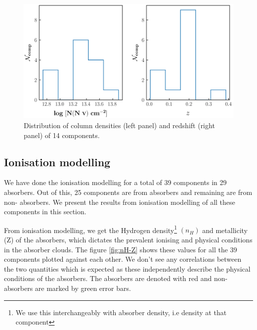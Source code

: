 \begin{figure}
    \centering
    \includegraphics[width=\linewidth]{Figures/NV_distribution_survey.png}
    \caption{Distribution of column densities (left panel) and redshift (right panel) of 14  components.}
    \label{fig:NV_distribution}
\end{figure}



\subsection{Ionisation modelling}  \label{sec:Ionisation-Modelling-statistics}

We have done the ionisation modelling for a total of 39 components in 29 absorbers. Out of this, 25 components are from  absorbers and remaining are from non- absorbers. We present the results from ionisation modelling of all these components in this section.

From ionisation modelling, we get the Hydrogen density\footnote{We use this interchangeably with absorber density, i.e density at that component} $(n_H)$ and metallicity (Z) of the absorbers, which dictates the prevalent ionising and physical conditions in the absorber clouds. The figure \ref{fig:nH-Z} shows these values for all the 39 components plotted against each other. We don't see any correlations between the two quantities which is expected as these independently describe the physical conditions of the absorbers. The  absorbers are denoted with red and non- absorbers are marked by green error bars. 


